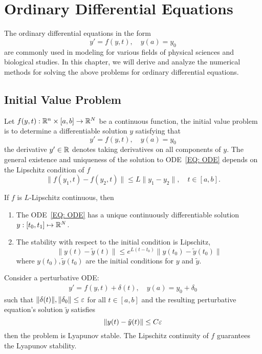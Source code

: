 \chapter{Ordinary Differential Equations}
The ordinary differential equations in the form
$$y' = f(y, t),\quad y(a) = y_0$$
are commonly used in modeling for various fields of physical sciences and biological studies. In this chapter, we will derive and analyze the numerical methods for solving the above problems for ordinary differential equations.
\section{Initial Value Problem}
Let $f(y, t): \mathbb R^n\times [a, b]\to \mathbb R^N$ be a continuous function, the initial value problem is to determine a differentiable solution $y$ satisfying that 
\begin{equation}\label{EQ: ODE}
    y' = f(y, t),\quad y(a) = y_0
\end{equation}
the derivative $y'\in\mathbb R$ denotes taking derivatives on all components of $y$. The general existence and uniqueness of the solution to ODE~\eqref{EQ: ODE} depends on the Lipschitz condition of $f$
$$\|f(y_1, t) - f(y_2, t)\|\le L\|y_1 - y_2\|,\quad t\in[a, b].$$
\begin{theorem}
    If $f$ is $L$-Lipschitz continuous, then 
    \begin{enumerate}
        \item The ODE~\eqref{EQ: ODE} has a unique continuously differentiable solution $y: [t_0, t_1]\mapsto \mathbb R^N$.
        \item The stability with respect to the initial condition is Lipschitz, 
        $$\|y(t) - \tilde{y}(t)\|\le e^{L(t- t_0)}\|y(t_0) - \tilde{y}(t_0)\|$$
        where $y(t_0), \tilde{y}(t_0)$ are the initial conditions for $y$ and $\tilde{y}$.
    \end{enumerate}
\end{theorem}
\begin{remark}
    Consider a perturbative ODE:
    \begin{equation}
        \begin{aligned}
            y' = f(y, t) + \delta(t),\quad y(a) = y_0 + \delta_0
        \end{aligned}
    \end{equation}
    such that $\|\delta(t)\|, \|\delta_0\|\le \varepsilon$ for all $t\in [a, b]$ and the resulting perturbative equation's solution $\tilde{y}$ satisfies 
    $$\|y(t) - \tilde{y}(t)\|\le C\varepsilon$$
    then the problem is Lyapunov stable. The Lipschitz continuity of $f$ guarantees the Lyapunov stability.
\end{remark}
